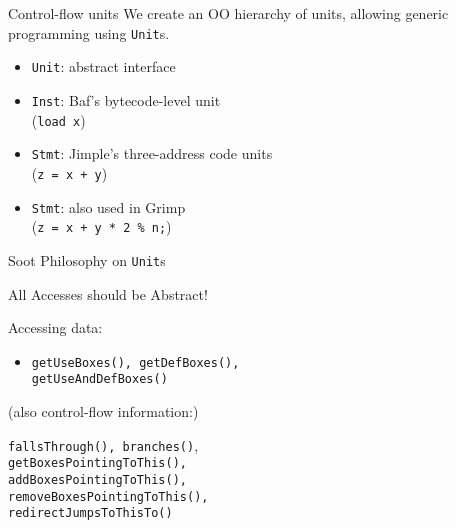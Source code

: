 \begin{slide}{Control-flow units}
We create an OO hierarchy of units, allowing generic programming using
{\tt Unit}s.

\begin{itemize}
\item {\tt Unit}: abstract interface

\item {\tt Inst}: Baf's bytecode-level unit\\
\qquad \qquad ({\tt load x})

\item {\tt Stmt}: Jimple's three-address code units\\
\qquad \qquad ({\tt z = x + y})

\item {\tt Stmt}: also used in Grimp\\
\qquad \qquad ({\tt z = x + y * 2 \% n;})
\end{itemize}
\end{slide}

\begin{slide}{Soot Philosophy on {\tt Unit}s}
\vspace*{-0.1in}
\begin{center}
All Accesses should be Abstract!
\end{center}

\vspace*{0.05in}
Accessing data:
\begin{itemize}
\item {\tt \red getUseBoxes(), getDefBoxes(),\\
\qquad \qquad  getUseAndDefBoxes()}
\end{itemize}

{\small 
(also control-flow information:)\\
\qquad \begin{minipage}{0.8\textwidth}
{\tt fallsThrough(), branches()},\\
{\tt getBoxesPointingToThis(), \\
 addBoxesPointingToThis(), \\
 removeBoxesPointingToThis(),}\\
{\tt redirectJumpsToThisTo()}
\end{minipage}}
\end{slide}

